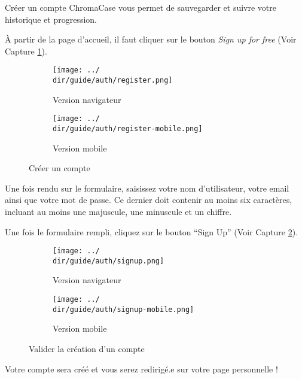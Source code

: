 Créer un compte ChromaCase vous permet de sauvegarder et suivre votre historique et progression.

À partir de la page d’accueil, il faut cliquer sur le bouton \textit{Sign up for free} (Voir Capture \ref{fig:signup}).

\begin{figure}[H]
	\begin{subfigure}[b]{0.7\textwidth}
		\texttt{[image: ../\\dir/guide/auth/register.png]}
		\caption{Version navigateur}
	\end{subfigure}
	\begin{subfigure}[b]{0.25\textwidth}
		\texttt{[image: ../\\dir/guide/auth/register-mobile.png]}
		\caption{Version mobile}
	\end{subfigure}
	\caption{Créer un compte}
	\label{fig:signup}
\end{figure}

Une fois rendu sur le formulaire, saisissez votre nom d’utilisateur, votre email ainsi que votre mot de passe.
Ce dernier doit contenir au moins six caractères, incluant au moins une majuscule, une minuscule et un chiffre.

Une fois le formulaire rempli, cliquez sur le bouton “Sign Up” (Voir Capture \ref{fig:signup-form}).

\begin{figure}[H]
	\begin{center}
		\begin{subfigure}[b]{0.7\textwidth}
			\texttt{[image: ../\\dir/guide/auth/signup.png]}
			\caption{Version navigateur}
		\end{subfigure}
		\begin{subfigure}[b]{0.25\textwidth}
			\texttt{[image: ../\\dir/guide/auth/signup-mobile.png]}
			\caption{Version mobile}
		\end{subfigure}
		\caption{Valider la création d'un compte}
		\label{fig:signup-form}
	\end{center}
\end{figure}

Votre compte sera créé et vous serez redirigé.e sur votre page personnelle !